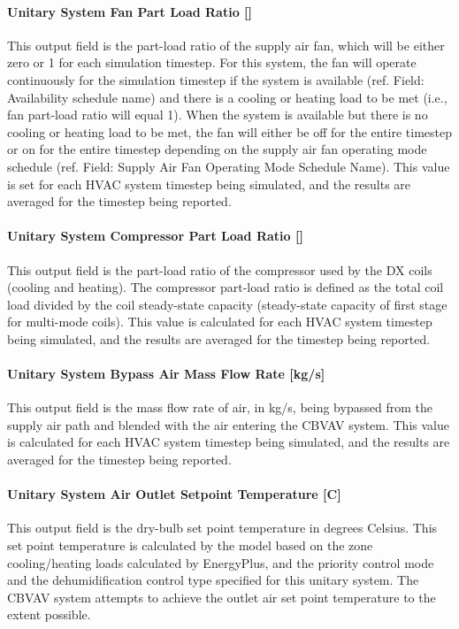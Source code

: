 \paragraph{\texorpdfstring{Unitary System Fan Part Load Ratio {[]}}{Unitary System Fan Part Load Ratio }}\label{unitary-system-fan-part-load-ratio-8}

This output field is the part-load ratio of the supply air fan, which will be either zero or 1 for each simulation timestep. For this system, the fan will operate continuously for the simulation timestep if the system is available (ref. Field: Availability schedule name) and there is a cooling or heating load to be met (i.e., fan part-load ratio will equal 1). When the system is available but there is no cooling or heating load to be met, the fan will either be off for the entire timestep or on for the entire timestep depending on the supply air fan operating mode schedule (ref. Field: Supply Air Fan Operating Mode Schedule Name). This value is set for each HVAC system timestep being simulated, and the results are averaged for the timestep being reported.

\paragraph{\texorpdfstring{Unitary System Compressor Part Load Ratio {[]}}{Unitary System Compressor Part Load Ratio }}\label{unitary-system-compressor-part-load-ratio-5}

This output field is the part-load ratio of the compressor used by the DX coils (cooling and heating). The compressor part-load ratio is defined as the total coil load divided by the coil steady-state capacity (steady-state capacity of first stage for multi-mode coils). This value is calculated for each HVAC system timestep being simulated, and the results are averaged for the timestep being reported.

\paragraph{Unitary System Bypass Air Mass Flow Rate {[}kg/s{]}}\label{unitary-system-bypass-air-mass-flow-rate-kgs}

This output field is the mass flow rate of air, in kg/s, being bypassed from the supply air path and blended with the air entering the CBVAV system. This value is calculated for each HVAC system timestep being simulated, and the results are averaged for the timestep being reported.

\paragraph{Unitary System Air Outlet Setpoint Temperature {[}C{]}}\label{unitary-system-air-outlet-setpoint-temperature-c}

This output field is the dry-bulb set point temperature in degrees Celsius. This set point temperature is calculated by the model based on the zone cooling/heating loads calculated by EnergyPlus, and the priority control mode and the dehumidification control type specified for this unitary system. The CBVAV system attempts to achieve the outlet air set point temperature to the extent possible.

